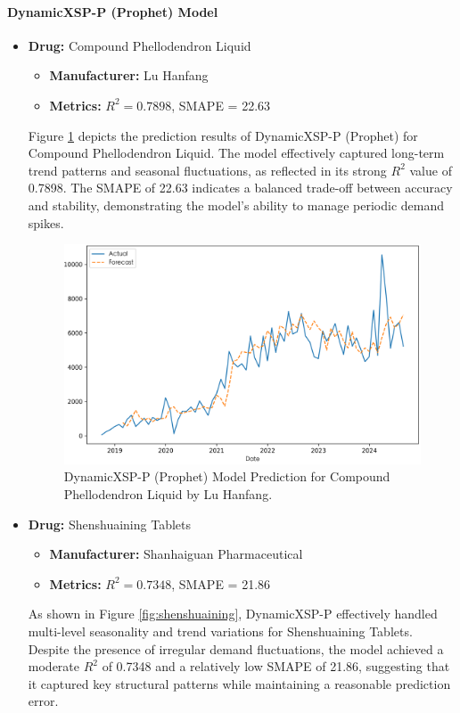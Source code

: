 \documentclass[12pt]{article}
\begin{document}
\paragraph{DynamicXSP-P (Prophet) Model}
\begin{itemize}
\item \textbf{Drug:} Compound Phellodendron Liquid
\begin{itemize}
\item \textbf{Manufacturer:} Lu Hanfang
\item \textbf{Metrics:} $R^2 = 0.7898$, SMAPE = 22.63
\end{itemize}
Figure \ref{fig:phellodendron} depicts the prediction results of DynamicXSP-P (Prophet) for Compound Phellodendron Liquid. The model effectively captured long-term trend patterns and seasonal fluctuations, as reflected in its strong $R^2$ value of 0.7898. The SMAPE of 22.63 indicates a balanced trade-off between accuracy and stability, demonstrating the model's ability to manage periodic demand spikes.
\begin{figure}[H]
\centering
\includegraphics[width=\linewidth]{../Result_Paper/Prophet_Prediction_复方黄柏液涂剂_鲁汉方.png}
\caption{DynamicXSP-P (Prophet) Model Prediction for Compound Phellodendron Liquid by Lu Hanfang.}
\label{fig:phellodendron}
\end{figure}
\item \textbf{Drug:} Shenshuaining Tablets
\begin{itemize}
\item \textbf{Manufacturer:} Shanhaiguan Pharmaceutical
\item \textbf{Metrics:} $R^2 = 0.7348$, SMAPE = 21.86
\end{itemize}
As shown in Figure \ref{fig:shenshuaining}, DynamicXSP-P effectively handled multi-level seasonality and trend variations for Shenshuaining Tablets. Despite the presence of irregular demand fluctuations, the model achieved a moderate $R^2$ of 0.7348 and a relatively low SMAPE of 21.86, suggesting that it captured key structural patterns while maintaining a reasonable prediction error.

\end{itemize}
\end{document}
